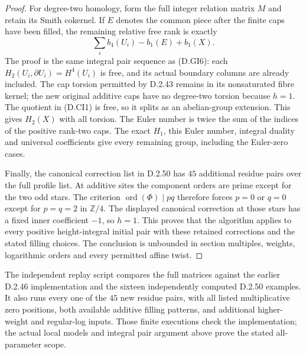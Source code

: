 \begin{proof}
For degree-two homology, form the full integer
relation matrix $M$ and retain its Smith cokernel.
If $E$ denotes the common piece after the finite
caps have been filled, the remaining relative
free rank is exactly
\[
           \sum_i b_4(U_i)-b_1(E)+b_1(X).
                                                        \tag{D.CI1}
\]
The proof is the same integral pair sequence as
(D.GI6): each $H_2(U_i,\partial U_i)=H^4(U_i)$
is free, and its actual boundary columns are
already included. The cap torsion permitted by
D.2.43 remains in its nonsaturated fibre kernel;
the new original additive caps have no degree-two
torsion because $h=1$. The quotient in (D.CI1)
is free, so it splits as an abelian-group extension.
This gives $H_2(X)$ with all torsion.
The Euler number is twice the sum of the indices
of the positive rank-two caps. The exact $H_1$,
this Euler number, integral duality and universal
coefficients give every remaining group, including
the Euler-zero cases.

Finally, the canonical correction list in D.2.50
has $45$ additional residue pairs over the full
profile list. At additive sites the component
orders are prime except for the two odd stars.
The criterion $\operatorname{ord}(\Phi)\mid pq$
therefore forces $p=0$ or $q=0$ except for
$p=q=2$ in $\mathbb Z/4$.
The displayed canonical correction at those
stars has a fixed inner coefficient $-1$,
so $h=1$. This proves that the algorithm applies
to every positive height-integral initial pair
with these retained corrections and the stated
filling choices. The conclusion is unbounded in
section multiples, weights, logarithmic orders
and every permitted affine twist.
\end{proof}

The independent replay script
compares the full matrices against the earlier
D.2.46 implementation and the sixteen independently
computed D.2.50 examples. It also runs every one
of the $45$ new residue pairs, with all listed
multiplicative zero positions, both available
additive filling patterns, and additional
higher-weight and regular-log inputs.
Those finite executions check the implementation;
the actual local models and integral pair argument
above prove the stated all-parameter scope.

